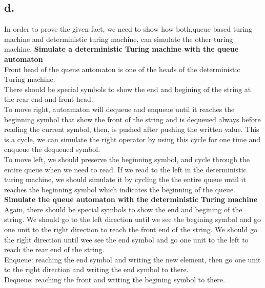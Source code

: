 \documentclass[12pt]{article}
\begin{document}
\subsection*{d.}
In order to prove the given fact, we need to show how both,queue based turing machine and deterministic turing machine, can simulate the other turing machine.
\textbf{Simulate a deterministic Turing machine with the queue automaton}\\
Front head of the queue automaton is one of the heads of the deterministic Turing machine. \\
There should be special symbols to show the end and begining of the string at the rear end and front head.\\
To move right, autoamaton will dequeue and enqueue until it reaches the beginning symbol that show the front of the string and is dequeued  always before reading the current symbol, then, is pushed after pushing the written value. This is a cycle, we can simulate the right operator by using this cycle for one time and enqueue the dequeued symbol.\\
To move left, we should preserve the beginning symbol, and cycle through the entire queue when we need to read. If we read to the left in the deterministic turing machine, we should simulate it by cycling the the entire queue until it reaches the beginning symbol which indicates the beginning of the queue.\\
\textbf{Simulate the queue automaton with the deterministic Turing machine}\\
Again, there should be special symbols to show the end and begining of the string. We should go to the left direction until we see the begining symbol and go one unit to the right direction to reach the front end of the string. We should go the right direction until wee see the end symbol and go one unit to the left to reach the rear end of the string. \\
Enqueue: reaching the end symbol and  writing the new element, then go one unit to the right direction and writing the end symbol to there.\\
Dequeue: reaching the front and writing the begining symbol to there.\\
\end{document}
